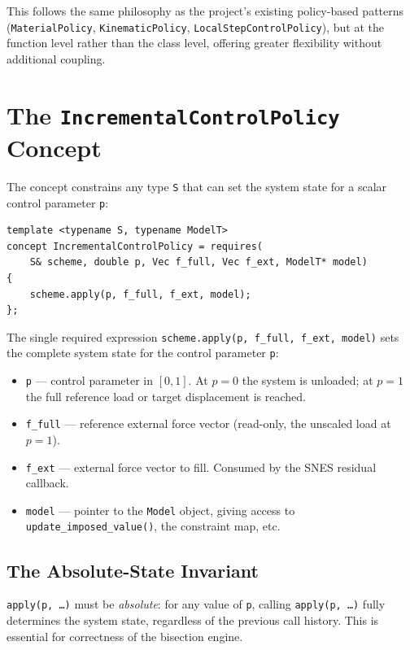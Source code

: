 This follows the same philosophy as the project's existing policy-based
patterns (\texttt{MaterialPolicy}, \texttt{KinematicPolicy},
\texttt{LocalStepControlPolicy}), but at the function level rather than
the class level, offering greater flexibility without additional
coupling.

\section{The \texttt{IncrementalControlPolicy} Concept}
\label{sec:ic-concept}

The concept constrains any type \texttt{S} that can set the system
state for a scalar control parameter \texttt{p}:

\begin{lstlisting}
template <typename S, typename ModelT>
concept IncrementalControlPolicy = requires(
    S& scheme, double p, Vec f_full, Vec f_ext, ModelT* model)
{
    scheme.apply(p, f_full, f_ext, model);
};
\end{lstlisting}

The single required expression \texttt{scheme.apply(p, f\_full, f\_ext,
model)} sets the complete system state for the control parameter
\texttt{p}:

\begin{itemize}
  \item \texttt{p} --- control parameter in $[0, 1]$.  At $p=0$ the
        system is unloaded; at $p=1$ the full reference load or target
        displacement is reached.
  \item \texttt{f\_full} --- reference external force vector (read-only,
        the unscaled load at $p=1$).
  \item \texttt{f\_ext} --- external force vector to fill.  Consumed by
        the SNES residual callback.
  \item \texttt{model} --- pointer to the \texttt{Model} object, giving
        access to \texttt{update\_imposed\_value()}, the constraint map,
        etc.
\end{itemize}

\subsection{The Absolute-State Invariant}
\label{ssec:ic-absolute}

\begin{remark}
\label{rem:ic-absolute}
\texttt{apply(p, \ldots)} must be \emph{absolute}: for any value of
\texttt{p}, calling \texttt{apply(p, \ldots)} fully determines the
system state, regardless of the previous call history.
This is essential for correctness of the bisection engine.
\end{remark}

